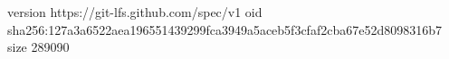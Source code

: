 version https://git-lfs.github.com/spec/v1
oid sha256:127a3a6522aea196551439299fca3949a5aceb5f3cfaf2cba67e52d8098316b7
size 289090

